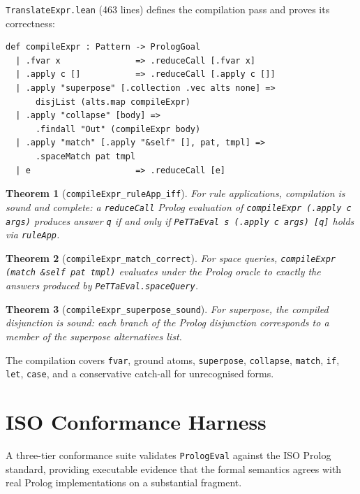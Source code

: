 \documentclass[]{article}
\newtheorem{theorem}{Theorem}
\newcommand{\code}[1]{\texttt{#1}}
\begin{document}
\code{TranslateExpr.lean} (463 lines) defines the compilation pass and proves
its correctness:

\begin{lstlisting}[language=lean]
def compileExpr : Pattern -> PrologGoal
  | .fvar x               => .reduceCall [.fvar x]
  | .apply c []           => .reduceCall [.apply c []]
  | .apply "superpose" [.collection .vec alts none] =>
      disjList (alts.map compileExpr)
  | .apply "collapse" [body] =>
      .findall "Out" (compileExpr body)
  | .apply "match" [.apply "&self" [], pat, tmpl] =>
      .spaceMatch pat tmpl
  | e                     => .reduceCall [e]
\end{lstlisting}

\begin{theorem}[\code{compileExpr\_ruleApp\_iff}]
For rule applications, compilation is sound and complete: a \code{reduceCall}
Prolog evaluation of \code{compileExpr (.apply c args)} produces answer \code{q}
if and only if \code{PeTTaEval s (.apply c args) [q]} holds via \code{ruleApp}.
\end{theorem}

\begin{theorem}[\code{compileExpr\_match\_correct}]
For space queries, \code{compileExpr (match \&self pat tmpl)} evaluates under
the Prolog oracle to exactly the answers produced by \code{PeTTaEval.spaceQuery}.
\end{theorem}

\begin{theorem}[\code{compileExpr\_superpose\_sound}]
For superpose, the compiled disjunction is sound: each branch of the
Prolog disjunction corresponds to a member of the superpose alternatives list.
\end{theorem}

The compilation covers \code{fvar}, ground atoms, \code{superpose},
\code{collapse}, \code{match}, \code{if}, \code{let}, \code{case}, and a
conservative catch-all for unrecognised forms.

\section{ISO Conformance Harness}
\label{sec:iso-conformance}

A three-tier conformance suite validates \code{PrologEval} against the
ISO Prolog standard, providing executable evidence that the formal
semantics agrees with real Prolog implementations on a substantial
fragment.
\end{document}
